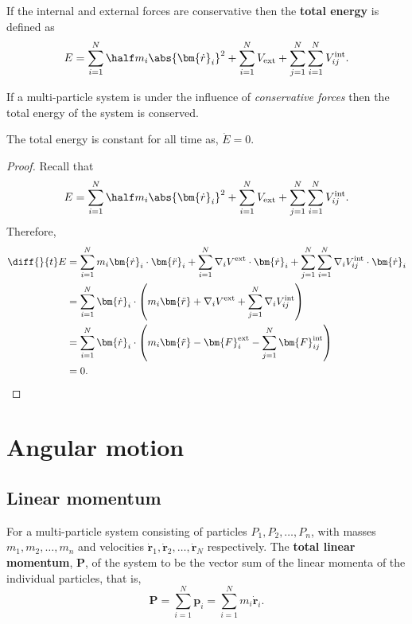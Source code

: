 \documentclass[12pt, a4paper]{article}
\begin{document}
\begin{mdthm}
    If the internal and external forces are conservative then the \textbf{total energy} is defined as 
    \[E=\sum_{i=1}^N \half m_i \abs{\bm{\dot{r}}_i}^2 + \sum_{i=1}^{N} V_{\text{ext}}+\sum_{j=1}^{N} \sum_{i=1}^N V_{ij}^{\text{int}}.\]
\end{mdthm}

\begin{mdthm}
    If a multi-particle system is under the influence of \textit{conservative forces} then the total energy of the system is conserved.
\end{mdthm}

\begin{mdnote}
    The total energy is constant for all time as, \(\dot{E}=0\).
\end{mdnote}

\begin{proof}
    Recall that 
    \[E=\sum_{i=1}^N \half m_i \abs{\bm{\dot{r}}_i}^2 + \sum_{i=1}^{N} V_{\text{ext}}+\sum_{j=1}^{N} \sum_{i=1}^N V_{ij}^{\text{int}}.\]
    Therefore,
    \[\begin{aligned}
        \diff{}{t} E &= \sum_{i=1}^{N} m_i \bm{\dot{r}}_i \cdot \bm{\ddot{r}}_i + \sum_{i=1}^{N} \nabla_i V^{\text{ext}} \cdot \bm{\dot{r}}_i + \sum_{j=1}^{N} \sum_{i=1}^{N} \nabla_i V_{ij}^{\text{int}} \cdot \bm{\dot{r}}_i \\
        &= \sum_{i=1}^{N} \bm{\dot{r}}_i \cdot \left( m_i \bm{\ddot{r}} + \nabla_i V^{\text{ext}} +\sum_{j=1}^{N} \nabla_i V_{ij}^{\text{int}} \right) \\
        &= \sum_{i=1}^{N} \bm{\dot{r}}_i \cdot \left( m_i \bm{\ddot{r}} - \bm{F}_i^{\text{ext}} -\sum_{j=1}^{N} \bm{F}_{ij}^{\text{int}} \right) \\
        &= 0.
    \end{aligned}\]
\end{proof}

\section{Angular motion}

\subsection{Linear momentum}

\begin{definition}
    For a multi-particle system consisting of particles \(P_1,P_2,\ldots, P_n\), with masses \(m_1,m_2,\ldots, m_n\) and velocities \(\dot{\bm{r}}_1,\dot{\bm{r}}_2,\ldots,\dot{\bm{r}}_N\) respectively. The \textbf{total linear \\ momentum}, \(\bm{P}\), of the system to be the vector sum of the linear momenta of the individual particles, that is,
    \[\bm{P}=\sum_{i=1}^N \bm{p}_i = \sum_{i=1}^N m_i \dot{\bm{r}}_i.\]
\end{definition}
\end{document}
